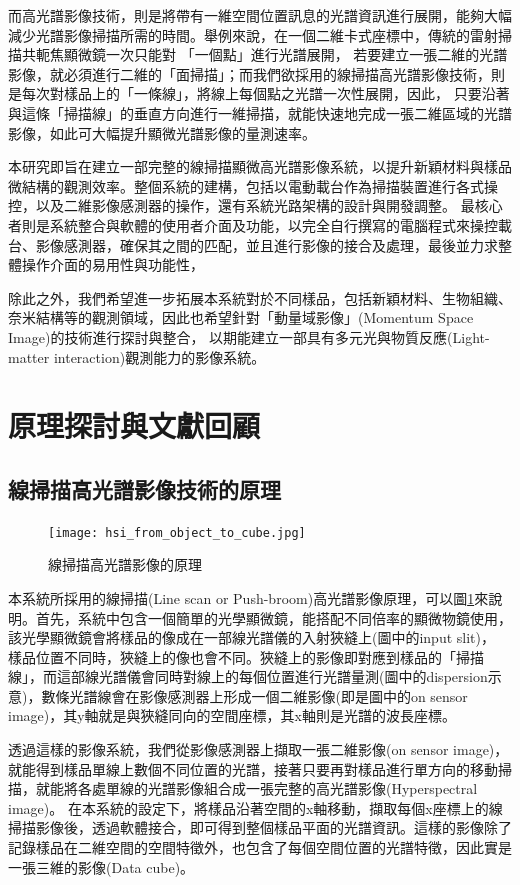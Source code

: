 \documentclass[12pt]{article}
\begin{document}
而高光譜影像技術，則是將帶有一維空間位置訊息的光譜資訊進行展開，能夠大幅減少光譜影像掃描所需的時間。舉例來說，在一個二維卡式座標中，傳統的雷射掃描共軛焦顯微鏡一次只能對
「一個點」進行光譜展開，
若要建立一張二維的光譜影像，就必須進行二維的「面掃描」；而我們欲採用的線掃描高光譜影像技術，則是每次對樣品上的「一條線」，將線上每個點之光譜一次性展開，因此，
只要沿著與這條「掃描線」的垂直方向進行一維掃描，就能快速地完成一張二維區域的光譜影像，如此可大幅提升顯微光譜影像的量測速率。

本研究即旨在建立一部完整的線掃描顯微高光譜影像系統，以提升新穎材料與樣品微結構的觀測效率。整個系統的建構，包括以電動載台作為掃描裝置進行各式操控，以及二維影像感測器的操作，還有系統光路架構的設計與開發調整。
最核心者則是系統整合與軟體的使用者介面及功能，以完全自行撰寫的電腦程式來操控載台、影像感測器，確保其之間的匹配，並且進行影像的接合及處理，最後並力求整體操作介面的易用性與功能性，

除此之外，我們希望進一步拓展本系統對於不同樣品，包括新穎材料、生物組織、奈米結構等的觀測領域，因此也希望針對「動量域影像」(Momentum Space Image)的技術進行探討與整合，
以期能建立一部具有多元光與物質反應(Light-matter interaction)觀測能力的影像系統。

\section{原理探討與文獻回顧}
\subsection{線掃描高光譜影像技術的原理}
\begin{figure}[h]
    \centering
    \texttt{[image: hsi\_from\_object\_to\_cube.jpg]}
    \caption{線掃描高光譜影像的原理}
    \label{fromObjecttoCube}
\end{figure}
本系統所採用的線掃描(Line scan or Push-broom)高光譜影像原理，可以圖\ref{fromObjecttoCube}來說明。首先，系統中包含一個簡單的光學顯微鏡，能搭配不同倍率的顯微物鏡使用，該光學顯微鏡會將樣品的像成在一部線光譜儀的入射狹縫上(圖中的input slit)，
樣品位置不同時，狹縫上的像也會不同。狹縫上的影像即對應到樣品的「掃描線」，而這部線光譜儀會同時對線上的每個位置進行光譜量測(圖中的dispersion示意)，數條光譜線會在影像感測器上形成一個二維影像(即是圖中的on sensor image)，其y軸就是與狹縫同向的空間座標，其x軸則是光譜的波長座標。

透過這樣的影像系統，我們從影像感測器上擷取一張二維影像(on sensor image)，就能得到樣品單線上數個不同位置的光譜，接著只要再對樣品進行單方向的移動掃描，就能將各處單線的光譜影像組合成一張完整的高光譜影像(Hyperspectral image)。
在本系統的設定下，將樣品沿著空間的x軸移動，擷取每個x座標上的線掃描影像後，透過軟體接合，即可得到整個樣品平面的光譜資訊。這樣的影像除了記錄樣品在二維空間的空間特徵外，也包含了每個空間位置的光譜特徵，因此實是一張三維的影像(Data cube)。
\end{document}
